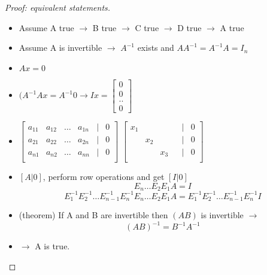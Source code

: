 \begin{proof}[Proof: equivalent statements]

	\begin{itemize}
		\item Assume A true $\to$ B true $\to$ C true $\to$ D true $\to$ A true
	\item Assume A is invertible $\to$ $A^{-1}$ exists and $A A^{-1} = A^{-1}A = I_{n}$
	\item $Ax = 0$
	\item $(A^{-1}Ax = A^{-1}0 \to Ix = \begin{bmatrix}  0 \\ 0 \\ .. \\ 0 \end{bmatrix} $
	\item $\begin{bmatrix} a_{11} & a_{12} & \ldots & a_{1n} & | & 0 \\a_{21} & a_{22} & \ldots & a_{2n} & | & 0 \\a_{n1} & a_{n2} & \ldots & a_{nn} & | & 0 \\ \end{bmatrix} $
	$\begin{bmatrix} x_1 &  &  &  & | & 0 \\ & x_2 &  &  & | & 0 \\ &  & x_3 &  & | & 0 \\ \end{bmatrix} $

	\item $[A|0]$, perform row operations and get $[I | 0]$
		\[E_{n} \ldots E_2E_1 A = I\]
		\[E_1^{-1}E_2^{-1}\ldots E_{n-1}^{-1}E_{n}^{-1}E_{n}\ldots E_2E_1A = E_1^{-1}E_2^{-1}\ldots E_{n-1}^{-1} E_{n}^{-1} I\]

	\item (theorem) If A and B are invertible then $(AB)$ is invertible $\to$ \[(AB)^{-1} = B^{-1}A^{-1}\]
		\item $\to$ A is true.
	\end{itemize}




\end{proof}




\newpage


